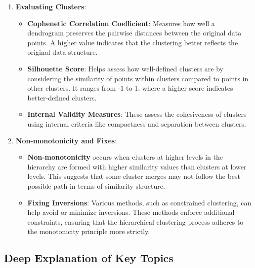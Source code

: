 \documentclass{article}
\begin{document}
\begin{enumerate}
\begin{enumerate}
    \item \textbf{Evaluating Clusters}:
    \begin{itemize}
        \item \textbf{Cophenetic Correlation Coefficient}: Measures how well a dendrogram preserves the pairwise distances between the original data points. A higher value indicates that the clustering better reflects the original data structure.
        \item \textbf{Silhouette Score}: Helps assess how well-defined clusters are by considering the similarity of points within clusters compared to points in other clusters. It ranges from -1 to 1, where a higher score indicates better-defined clusters.
        \item \textbf{Internal Validity Measures}: These assess the cohesiveness of clusters using internal criteria like compactness and separation between clusters.
    \end{itemize}

    \item \textbf{Non-monotonicity and Fixes}:
    \begin{itemize}
        \item \textbf{Non-monotonicity} occurs when clusters at higher levels in the hierarchy are formed with higher similarity values than clusters at lower levels. This suggests that some cluster merges may not follow the best possible path in terms of similarity structure.
        \item \textbf{Fixing Inversions}: Various methods, such as constrained clustering, can help avoid or minimize inversions. These methods enforce additional constraints, ensuring that the hierarchical clustering process adheres to the monotonicity principle more strictly.
    \end{itemize}
\end{enumerate}

\hrulefill

\subsection{Deep Explanation of Key Topics}


\end{enumerate}
\end{document}
